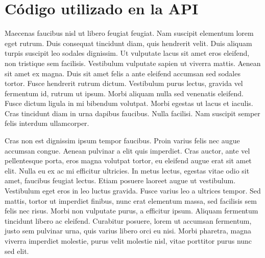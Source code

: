 \chapter{Código utilizado en la API}\label{app:repository}
Maecenas faucibus nisl ut libero feugiat feugiat. Nam suscipit elementum lorem eget rutrum. Duis consequat tincidunt diam, quis hendrerit velit. Duis aliquam turpis suscipit leo sodales dignissim. Ut vulputate lacus sit amet eros eleifend, non tristique sem facilisis. Vestibulum vulputate sapien ut viverra mattis. Aenean sit amet ex magna. Duis sit amet felis a ante eleifend accumsan sed sodales tortor. Fusce hendrerit rutrum dictum. Vestibulum purus lectus, gravida vel fermentum id, rutrum ut ipsum. Morbi aliquam nulla sed venenatis eleifend. Fusce dictum ligula in mi bibendum volutpat. Morbi egestas ut lacus et iaculis. Cras tincidunt diam in urna dapibus faucibus. Nulla facilisi. Nam suscipit semper felis interdum ullamcorper.\par

Cras non est dignissim ipsum tempor faucibus. Proin varius felis nec augue accumsan congue. Aenean pulvinar a elit quis imperdiet. Cras auctor, ante vel pellentesque porta, eros magna volutpat tortor, eu eleifend augue erat sit amet elit. Nulla eu ex ac mi efficitur ultricies. In metus lectus, egestas vitae odio sit amet, faucibus feugiat lectus. Etiam posuere laoreet augue ut vestibulum. Vestibulum eget eros in leo luctus gravida. Fusce varius leo a ultrices tempor. Sed mattis, tortor ut imperdiet finibus, nunc erat elementum massa, sed facilisis sem felis nec risus. Morbi non vulputate purus, a efficitur ipsum. Aliquam fermentum tincidunt libero ac eleifend. Curabitur posuere, lorem ut accumsan fermentum, justo sem pulvinar urna, quis varius libero orci eu nisi. Morbi pharetra, magna viverra imperdiet molestie, purus velit molestie nisl, vitae porttitor purus nunc sed elit. 